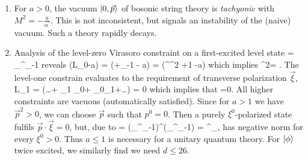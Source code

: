 \begin{enumerate}
	\item For $a>0$, the vacuum $\ket{0,\vec{p}}$ of bosonic string theory is \emph{tachyonic} with $M^2=-\frac{a}{\alpha^\prime}$. This is not inconsistent, but signals an instability of the (naive) vacuum. Such a theory rapidly decays.
	\item Analysis of the level-zero Virasoro constraint on a first-excited level state
	\bse 
	\ket{\phi} = \xi_\mu \alpha^\mu_{-1}
	\ese 
	reveals
	\bse 
	(L_0-a)\ket{\phi} = \left(+\vec{\alpha}\cdot \vec{\alpha}_{-1} - a\right)\ket{\phi} = \left(\alpha^\prime {}^2 +1 -a\right) \ket{\phi}
	\ese 
	which implies
	\be
	^2= .
	\ee 
	The level-one constrain evaluates to the requirement of transverse polarization $\vec{\xi}$,
	\bse 
	L_1 \ket{\phi}= \half \left(\dots+ \vec{\alpha}_1 \cdot \vec{\alpha}_0+ \vec{\alpha}_0\cdot \vec{\alpha}_1+\dots\right) \ket{\phi} = \sqrt{2 \alpha^\prime} \cdot \vec{\xi} \ket{\phi} \stackrel{!}{=} 0
	\ese 
	which implies that
	\be 
	 \cdot \vec{\xi} =0.
	\ee 
	All higher constraints are vacuous (automatically satisfied). Since for $a>1$ we have $\vec{p}^2>0$, we can choose $\vec{p}$ such that $p^0=0$. Then a purely $\xi^0$-polarized state fulfils $\vec{p}\cdot \vec{\xi}=0$, but, due to 
	\bse 
	\braket{\phi}{\phi} =  (\xi_\mu \alpha^\mu_{-1})^\dagger (\xi_\mu \alpha^\mu_{-1})  = \xi^\mu \xi_\mu,
	\ese 
	has negative norm for every $\xi^0>0$. Thus $a\leq 1$ is necessary for a unitary quantum theory. For $\ket{\phi}$ twice excited, we similarly find we need $d \leq 26$.
\end{enumerate}

